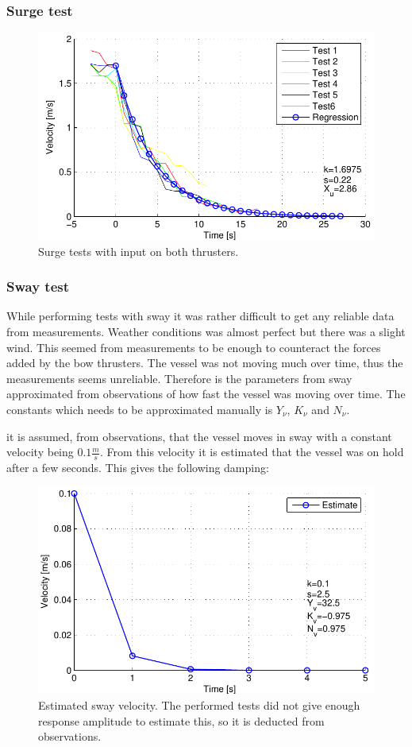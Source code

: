 \subsubsection{Surge test}
\begin{figure}[H]
	\centering
	\includegraphics{plot/surgecoeffs}
	\caption{Surge tests with input on both thrusters.}
	\label{fig:pbtest}
\end{figure}

\subsubsection{Sway test}
While performing tests with sway it was rather difficult to get any reliable data from measurements. Weather conditions was almost perfect but there was a slight wind. This seemed from measurements to be enough to counteract the forces added by the bow thrusters. The vessel was not moving much over time, thus the measurements seems unreliable. Therefore is the parameters from sway approximated from observations of how fast the vessel was moving over time. The constants which needs to be approximated manually is $Y_\nu$, $K_\nu$ and $N_\nu$.

it is assumed, from observations, that the vessel moves in sway with a constant velocity being $0.1\frac{m}{s}$. From this velocity it is estimated that the vessel was on hold after a few seconds. This gives the following damping:
\begin{figure}[H]
	\centering
	\includegraphics{plot/swaycoeffs}
	\caption{Estimated sway velocity. The performed tests did not give enough response amplitude to estimate this, so it is deducted from observations.}
	\label{fig:swaycoeffs}
\end{figure}

